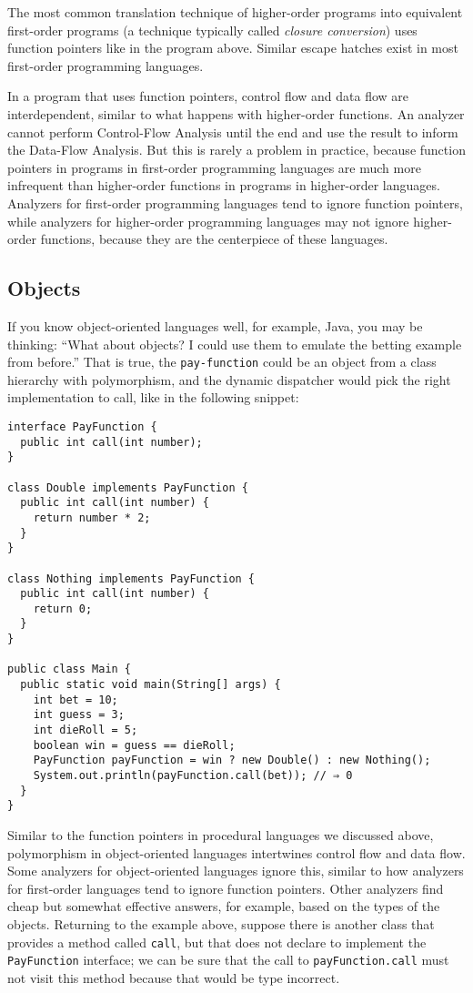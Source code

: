 \documentclass[12pt, oneside]{book}
\begin{document}
The most common translation technique of higher-order programs into equivalent first-order programs (a technique typically called \emph{closure conversion}) uses function pointers like in the program above. Similar escape hatches exist in most first-order programming languages.

In a program that uses function pointers, control flow and data flow are interdependent, similar to what happens with higher-order functions. An analyzer cannot perform Control-Flow Analysis until the end and use the result to inform the Data-Flow Analysis. But this is rarely a problem in practice, because function pointers in programs in first-order programming languages are much more infrequent than higher-order functions in programs in higher-order languages. Analyzers for first-order programming languages tend to ignore function pointers, while analyzers for higher-order programming languages may not ignore higher-order functions, because they are the centerpiece of these languages.

\subsection{Objects}
\label{section:objects}

If you know object-oriented languages well, for example, Java, you may be thinking: “What about objects? I could use them to emulate the betting example from before.” That is true, the \texttt{pay-function} could be an object from a class hierarchy with polymorphism, and the dynamic dispatcher would pick the right implementation to call, like in the following snippet:

\begin{Verbatim}
interface PayFunction {
  public int call(int number);
}

class Double implements PayFunction {
  public int call(int number) {
    return number * 2;
  }
}

class Nothing implements PayFunction {
  public int call(int number) {
    return 0;
  }
}

public class Main {
  public static void main(String[] args) {
    int bet = 10;
    int guess = 3;
    int dieRoll = 5;
    boolean win = guess == dieRoll;
    PayFunction payFunction = win ? new Double() : new Nothing();
    System.out.println(payFunction.call(bet)); // ⇒ 0
  }
}
\end{Verbatim}

Similar to the function pointers in procedural languages we discussed above, polymorphism in object-oriented languages intertwines control flow and data flow. Some analyzers for object-oriented languages ignore this, similar to how analyzers for first-order languages tend to ignore function pointers. Other analyzers find cheap but somewhat effective answers, for example, based on the types of the objects. Returning to the example above, suppose there is another class that provides a method called \texttt{call}, but that does not declare to implement the \texttt{PayFunction} interface; we can be sure that the call to \texttt{payFunction.call} must not visit this method because that would be type incorrect.
\end{document}
